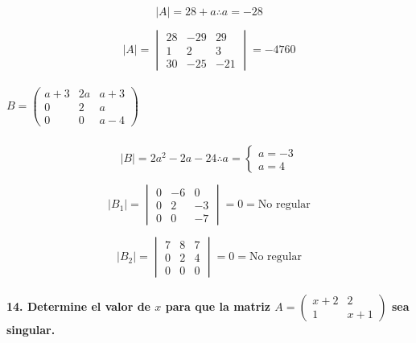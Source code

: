 \documentclass[
]{article}
\begin{document}
\[
|A| = 28+a \therefore a = -28
\]

\[
|A| = \begin{vmatrix}
    28&-29&29\\
    1&2&3\\
    30&-25&-21
\end{vmatrix} = -4760
\]

\hypertarget{b-beginpmatrixa3-2a-a3-0-2a00a-4endpmatrix}{%
\subparagraph{\texorpdfstring{\(B = \begin{pmatrix}a+3 & 2a & a+3 \\ 0& 2&a\\0&0&a-4\end{pmatrix}\)}{B = \textbackslash begin\{pmatrix\}a+3 \& 2a \& a+3 \textbackslash\textbackslash{} 0\& 2\&a\textbackslash\textbackslash0\&0\&a-4\textbackslash end\{pmatrix\}}}\label{b-beginpmatrixa3-2a-a3-0-2a00a-4endpmatrix}}

\[
|B| = 2a^2 - 2a - 24 \therefore a = \begin{cases}
    a = -3\\
    a = 4
\end{cases}
\]

\[
|B_1| = \begin{vmatrix}
    0&-6&0\\0&2&-3\\0&0&-7
\end{vmatrix} = 0 = \text{No regular}
\]

\[
|B_2| = \begin{vmatrix}
    7&8&7\\
    0&2&4\\
    0&0&0
\end{vmatrix} = 0 = \text{No regular}
\]

\hypertarget{determine-el-valor-de-x-para-que-la-matriz-a-beginpmatrixx2-2-1-x1endpmatrix-sea-singular.}{%
\paragraph{\texorpdfstring{14. Determine el valor de \(x\) para que la
matriz \(A = \begin{pmatrix}x+2 & 2 \\1 & x+1\end{pmatrix}\) sea
singular.}{14. Determine el valor de x para que la matriz A = \textbackslash begin\{pmatrix\}x+2 \& 2 \textbackslash\textbackslash1 \& x+1\textbackslash end\{pmatrix\} sea singular.}}\label{determine-el-valor-de-x-para-que-la-matriz-a-beginpmatrixx2-2-1-x1endpmatrix-sea-singular.}}
\end{document}
